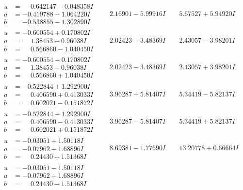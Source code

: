 \documentclass[1p]{elsarticle_modified}
\theoremstyle{definition}
\begin{document}
$$\begin{array}{c|c|c}
\begin{aligned}
u &= \phantom{-}0.642147 - 0.048358 I \\
a &= -0.419788 - 1.064220 I \\
b &= -0.538855 - 1.302890 I\end{aligned}
 & \phantom{-}2.16901 - 5.99916 I & \phantom{-}5.67527 + 5.94920 I \\ \hline\begin{aligned}
u &= -0.600554 + 0.170802 I \\
a &= \phantom{-}1.38453 + 0.96038 I \\
b &= \phantom{-}0.566860 - 1.040450 I\end{aligned}
 & \phantom{-}2.02423 + 3.48369 I & \phantom{-}2.43057 - 3.98201 I \\ \hline\begin{aligned}
u &= -0.600554 - 0.170802 I \\
a &= \phantom{-}1.38453 - 0.96038 I \\
b &= \phantom{-}0.566860 + 1.040450 I\end{aligned}
 & \phantom{-}2.02423 - 3.48369 I & \phantom{-}2.43057 + 3.98201 I \\ \hline\begin{aligned}
u &= -0.522844 + 1.292900 I \\
a &= \phantom{-}0.406590 + 0.413033 I \\
b &= \phantom{-}0.602021 - 0.151872 I\end{aligned}
 & \phantom{-}3.96287 + 5.81407 I & \phantom{-}5.34419 - 5.82137 I \\ \hline\begin{aligned}
u &= -0.522844 - 1.292900 I \\
a &= \phantom{-}0.406590 - 0.413033 I \\
b &= \phantom{-}0.602021 + 0.151872 I\end{aligned}
 & \phantom{-}3.96287 - 5.81407 I & \phantom{-}5.34419 + 5.82137 I \\ \hline\begin{aligned}
u &= -0.03051 + 1.50118 I \\
a &= -0.07962 - 1.68896 I \\
b &= \phantom{-}0.24430 + 1.51368 I\end{aligned}
 & \phantom{-}8.69381 - 1.77690 I & \phantom{-}13.20778 + 0.66664 I \\ \hline\begin{aligned}
u &= -0.03051 - 1.50118 I \\
a &= -0.07962 + 1.68896 I \\
b &= \phantom{-}0.24430 - 1.51368 I\end{aligned}

\end{array}$$
\end{document}

